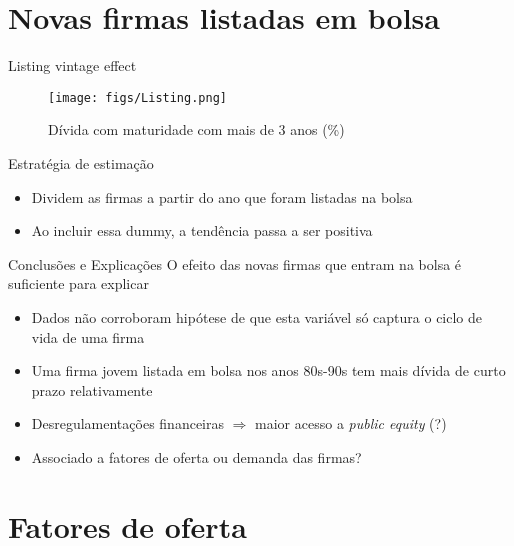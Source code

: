 \documentclass[presentation]{beamer}
\begin{document}
\section{Novas firmas listadas em bolsa}
\label{sec:orgf3d2b6c}
\begin{frame}[label={sec:org78decca}]{Listing vintage effect}
\begin{figure}[htbp]
\caption{Dívida com maturidade com mais de 3 anos (\%)}
\centerline{\texttt{[image: figs/Listing.png]}}
\end{figure}
\end{frame}
\begin{frame}[label={sec:org1cbca5a}]{Estratégia de estimação}
\begin{itemize}
\item Dividem as firmas a partir do ano que foram listadas na bolsa
\item Ao incluir essa dummy, a tendência passa a ser positiva
\end{itemize}

\begin{block}{Conclusões e Explicações}
O efeito das novas firmas que entram na bolsa é suficiente para explicar
\begin{itemize}
\item Dados não corroboram hipótese de que esta variável só captura o ciclo de vida de uma firma
\item Uma firma jovem listada em bolsa nos anos 80s-90s tem mais dívida de curto prazo relativamente
\item Desregulamentações financeiras \(\Rightarrow\) maior acesso a \emph{public equity} (?)
\item Associado a fatores de oferta ou demanda das firmas?
\end{itemize}
\end{block}
\end{frame}

\section{Fatores de oferta}
\label{sec:orga56a290}
\end{document}
